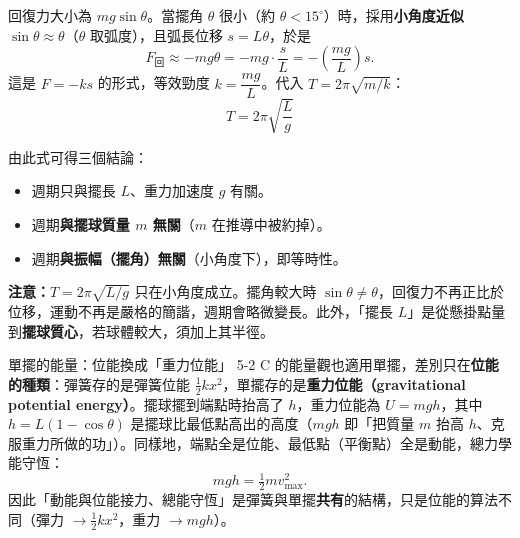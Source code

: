 \documentclass[11pt]{article}
\begin{document}
回復力大小為 $mg\sin\theta$。當擺角 $\theta$ 很小（約 $\theta<15^\circ$）時，採用\textbf{小角度近似} $\sin\theta\approx\theta$（$\theta$ 取弧度），且弧長位移 $s=L\theta$，於是
$$F_{\text{回}}\approx -mg\theta=-mg\cdot\frac{s}{L}=-\left(\frac{mg}{L}\right)s.$$
這是 $F=-ks$ 的形式，等效勁度 $k=\dfrac{mg}{L}$。代入 $T=2\pi\sqrt{m/k}$：
$$\boxed{\;T=2\pi\sqrt{\frac{L}{g}}\;}$$

由此式可得三個結論：
\begin{itemize}\setlength{\itemsep}{1pt}
\item 週期只與擺長 $L$、重力加速度 $g$ 有關。
\item 週期\textbf{與擺球質量 $m$ 無關}（$m$ 在推導中被約掉）。
\item 週期\textbf{與振幅（擺角）無關}（小角度下），即等時性。
\end{itemize}

\textbf{注意：}$T=2\pi\sqrt{L/g}$ 只在小角度成立。擺角較大時 $\sin\theta\neq\theta$，回復力不再正比於位移，運動不再是嚴格的簡諧，週期會略微變長。此外，「擺長 $L$」是從懸掛點量到\textbf{擺球質心}，若球體較大，須加上其半徑。

\begin{補充框}{單擺的能量：位能換成「重力位能」}
5-2 C 的能量觀也適用單擺，差別只在\textbf{位能的種類}：彈簧存的是彈簧位能 $\tfrac12 kx^2$，單擺存的是\textbf{重力位能（gravitational potential energy）}。擺球擺到端點時抬高了 $h$，重力位能為 $U=mgh$，其中 $h=L(1-\cos\theta)$ 是擺球比最低點高出的高度（$mgh$ 即「把質量 $m$ 抬高 $h$、克服重力所做的功」）。同樣地，端點全是位能、最低點（平衡點）全是動能，總力學能守恆：
$$mgh=\tfrac12 m v_{\max}^2.$$
因此「動能與位能接力、總能守恆」是彈簧與單擺\textbf{共有}的結構，只是位能的算法不同（彈力 $\to\tfrac12 kx^2$，重力 $\to mgh$）。
\end{補充框}
\end{document}

